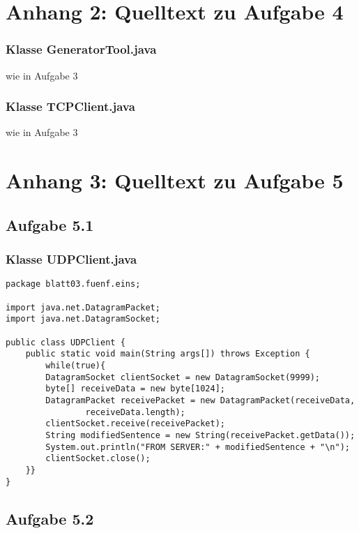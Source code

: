 \documentclass[twoside]{article}
\begin{document}
\section*{Anhang 2: Quelltext zu Aufgabe 4}
\subsubsection*{Klasse GeneratorTool.java}
wie in Aufgabe 3
\subsubsection*{Klasse TCPClient.java}
wie in Aufgabe 3
\section*{Anhang 3: Quelltext zu Aufgabe 5}
\subsection*{Aufgabe 5.1}
\subsubsection*{Klasse UDPClient.java}
\begin{lstlisting}
package blatt03.fuenf.eins;

import java.net.DatagramPacket;
import java.net.DatagramSocket;

public class UDPClient {
	public static void main(String args[]) throws Exception {
		while(true){
		DatagramSocket clientSocket = new DatagramSocket(9999);
		byte[] receiveData = new byte[1024];
		DatagramPacket receivePacket = new DatagramPacket(receiveData,
				receiveData.length);
		clientSocket.receive(receivePacket);
		String modifiedSentence = new String(receivePacket.getData());
		System.out.println("FROM SERVER:" + modifiedSentence + "\n");
		clientSocket.close();
	}}
}
\end{lstlisting}
\subsection*{Aufgabe 5.2}
\end{document}
